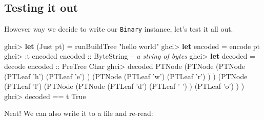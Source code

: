 \documentclass[]{article}
\newenvironment{Shaded}{}{}
\newcommand{\KeywordTok}[1]{\textcolor[rgb]{0.00,0.44,0.13}{\textbf{{#1}}}}
\newcommand{\DataTypeTok}[1]{\textcolor[rgb]{0.56,0.13,0.00}{{#1}}}
\newcommand{\CharTok}[1]{\textcolor[rgb]{0.25,0.44,0.63}{{#1}}}
\newcommand{\StringTok}[1]{\textcolor[rgb]{0.25,0.44,0.63}{{#1}}}
\newcommand{\CommentTok}[1]{\textcolor[rgb]{0.38,0.63,0.69}{\textit{{#1}}}}
\newcommand{\OtherTok}[1]{\textcolor[rgb]{0.00,0.44,0.13}{{#1}}}
\newcommand{\FunctionTok}[1]{\textcolor[rgb]{0.02,0.16,0.49}{{#1}}}
\newcommand{\NormalTok}[1]{{#1}}
\begin{document}
\subsection{Testing it out}\label{testing-it-out}

However way we decide to write our \texttt{Binary} instance, let's test
it all out.

\begin{Shaded}
\begin{Highlighting}[]
\NormalTok{ghci}\FunctionTok{>} \KeywordTok{let} \NormalTok{(}\DataTypeTok{Just} \NormalTok{pt) }\FunctionTok{=} \NormalTok{runBuildTree }\StringTok{"hello world"}
\NormalTok{ghci}\FunctionTok{>} \KeywordTok{let} \NormalTok{encoded }\FunctionTok{=} \NormalTok{encode pt}
\NormalTok{ghci}\FunctionTok{>} \FunctionTok{:}\NormalTok{t encoded}
\OtherTok{encoded ::} \DataTypeTok{ByteString}       \CommentTok{-- a string of bytes}
\NormalTok{ghci}\FunctionTok{>} \KeywordTok{let} \NormalTok{decoded }\FunctionTok{=} \NormalTok{decode}\OtherTok{ encoded ::} \DataTypeTok{PreTree} \DataTypeTok{Char}
\NormalTok{ghci}\FunctionTok{>} \NormalTok{decoded}
\DataTypeTok{PTNode} \NormalTok{(}\DataTypeTok{PTNode} \NormalTok{(}\DataTypeTok{PTNode} \NormalTok{(}\DataTypeTok{PTLeaf} \CharTok{'h'}\NormalTok{)}
                       \NormalTok{(}\DataTypeTok{PTLeaf} \CharTok{'e'}\NormalTok{)}
               \NormalTok{)}
               \NormalTok{(}\DataTypeTok{PTNode} \NormalTok{(}\DataTypeTok{PTLeaf} \CharTok{'w'}\NormalTok{)}
                       \NormalTok{(}\DataTypeTok{PTLeaf} \CharTok{'r'}\NormalTok{)}
               \NormalTok{)}
       \NormalTok{)}
       \NormalTok{(}\DataTypeTok{PTNode} \NormalTok{(}\DataTypeTok{PTLeaf} \CharTok{'l'}\NormalTok{)}
               \NormalTok{(}\DataTypeTok{PTNode} \NormalTok{(}\DataTypeTok{PTNode} \NormalTok{(}\DataTypeTok{PTLeaf} \CharTok{'d'}\NormalTok{)}
                               \NormalTok{(}\DataTypeTok{PTLeaf} \CharTok{' '}\NormalTok{)}
                       \NormalTok{)}
                       \NormalTok{(}\DataTypeTok{PTLeaf} \CharTok{'o'}\NormalTok{)}
               \NormalTok{)}
       \NormalTok{)}
\NormalTok{ghci}\FunctionTok{>} \NormalTok{decoded }\FunctionTok{==} \NormalTok{t}
\DataTypeTok{True}
\end{Highlighting}
\end{Shaded}

Neat! We can also write it to a file and re-read:
\end{document}

